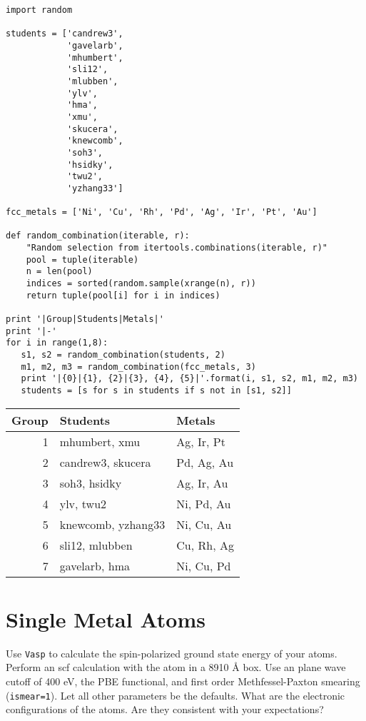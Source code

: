 \documentclass[11pt]{article}
\begin{document}
\begin{verbatim}
import random

students = ['candrew3',
            'gavelarb',
            'mhumbert',
            'sli12',
            'mlubben',
            'ylv',
            'hma',
            'xmu',
            'skucera',
            'knewcomb',
            'soh3',
            'hsidky',
            'twu2',
            'yzhang33']

fcc_metals = ['Ni', 'Cu', 'Rh', 'Pd', 'Ag', 'Ir', 'Pt', 'Au'] 

def random_combination(iterable, r):
    "Random selection from itertools.combinations(iterable, r)"
    pool = tuple(iterable)
    n = len(pool)
    indices = sorted(random.sample(xrange(n), r))
    return tuple(pool[i] for i in indices)

print '|Group|Students|Metals|'
print '|-'
for i in range(1,8):
   s1, s2 = random_combination(students, 2)
   m1, m2, m3 = random_combination(fcc_metals, 3)
   print '|{0}|{1}, {2}|{3}, {4}, {5}|'.format(i, s1, s2, m1, m2, m3)
   students = [s for s in students if s not in [s1, s2]]
\end{verbatim}

\begin{center}
\begin{tabular}{rll}
Group & Students & Metals\\
\hline
1 & mhumbert, xmu & Ag, Ir, Pt\\
2 & candrew3, skucera & Pd, Ag, Au\\
3 & soh3, hsidky & Ag, Ir, Au\\
4 & ylv, twu2 & Ni, Pd, Au\\
5 & knewcomb, yzhang33 & Ni, Cu, Au\\
6 & sli12, mlubben & Cu, Rh, Ag\\
7 & gavelarb, hma & Ni, Cu, Pd\\
\end{tabular}
\end{center}


\section{Single Metal Atoms}
\label{sec-1}

Use \texttt{Vasp} to calculate the spin-polarized ground state energy of your atoms. Perform an scf calculation with the atom in a 8\texttimes{}9\texttimes{}10 \AA{} box. Use an plane wave cutoff of 400 eV, the PBE functional, and first order Methfessel-Paxton smearing (\verb~ismear=1~). Let all other parameters be the defaults. What are the electronic configurations of the atoms. Are they consistent with your expectations?
\end{document}
